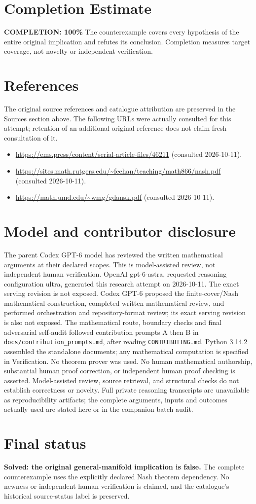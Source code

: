 \documentclass[11pt]{article}
\begin{document}
\section{Completion Estimate}
\noindent\textbf{COMPLETION: 100\%}
The counterexample covers every hypothesis of the entire original implication and
refutes its conclusion. Completion measures target coverage, not novelty or
independent verification.
\section{References}
The original source references and catalogue attribution are preserved in the
Sources section above. The following URLs were actually consulted for this attempt;
retention of an additional original reference does not claim fresh consultation of it.
\begin{itemize}
\item \url{https://ems.press/content/serial-article-files/46211} (consulted 2026-10-11). 
\item \url{https://sites.math.rutgers.edu/~feehan/teaching/math866/nash.pdf} (consulted 2026-10-11). 
\item \url{https://math.umd.edu/~wmg/gdansk.pdf} (consulted 2026-10-11). 
\end{itemize}
\section{Model and contributor disclosure}
The parent Codex GPT-6 model has reviewed the written mathematical arguments at their declared scopes. This is model-assisted review, not independent human verification.
OpenAI gpt-6-astra, requested reasoning configuration ultra, generated this research
attempt on 2026-10-11. The exact serving revision is not exposed. Codex GPT-6
proposed the finite-cover/Nash mathematical construction, completed written mathematical review, and performed orchestration and repository-format review; its exact serving revision
is also not exposed. The mathematical route, boundary checks and final adversarial
self-audit followed contribution prompts A then B in
\texttt{docs/contribution\_prompts.md}, after reading \texttt{CONTRIBUTING.md}.
Python 3.14.2 assembled the standalone documents; any mathematical computation is
specified in Verification. No theorem prover was used. No human mathematical
authorship, substantial human proof correction, or independent human proof checking
is asserted. Model-assisted review, source retrieval, and structural checks do not
establish correctness or novelty. Full private reasoning transcripts are unavailable
as reproducibility artifacts; the complete arguments, inputs and outcomes actually
used are stated here or in the companion batch audit.
\section{Final status}
\textbf{Solved: the original general-manifold implication is false.}
The complete counterexample uses the explicitly declared Nash theorem dependency.
No newness or independent human verification is claimed, and the catalogue's
historical source-status label is preserved.
\end{document}

